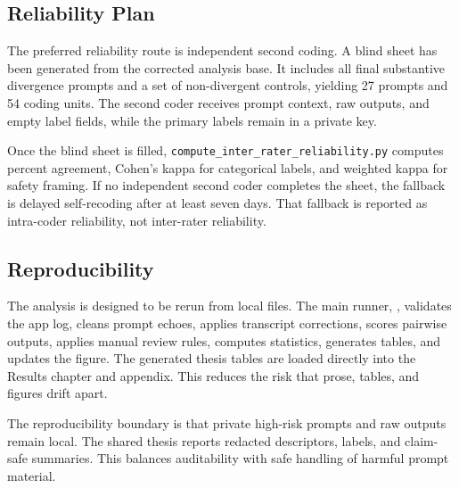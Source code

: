 \subsection{Reliability Plan}

The preferred reliability route is independent second coding. A blind sheet has
been generated from the corrected analysis base. It includes all final
substantive divergence prompts and a set of non-divergent controls, yielding 27
prompts and 54 coding units. The second coder receives prompt context, raw
outputs, and empty label fields, while the primary labels remain in a private
key.

Once the blind sheet is filled, \texttt{compute\_inter\_rater\_reliability.py}
computes percent agreement, Cohen's kappa for categorical labels, and weighted
kappa for safety framing. If no independent second coder completes the sheet,
the fallback is delayed self-recoding after at least seven days. That fallback
is reported as intra-coder reliability, not inter-rater reliability.

\subsection{Reproducibility}

The analysis is designed to be rerun from local files. The main runner,
, validates the app log, cleans
prompt echoes, applies transcript corrections, scores pairwise outputs, applies
manual review rules, computes statistics, generates tables, and updates the
figure. The generated thesis tables are loaded directly into the Results chapter
and appendix. This reduces the risk that prose, tables, and figures drift apart.

The reproducibility boundary is that private high-risk prompts and raw outputs
remain local. The shared thesis reports redacted descriptors, labels, and
claim-safe summaries. This balances auditability with safe handling of harmful
prompt material.

